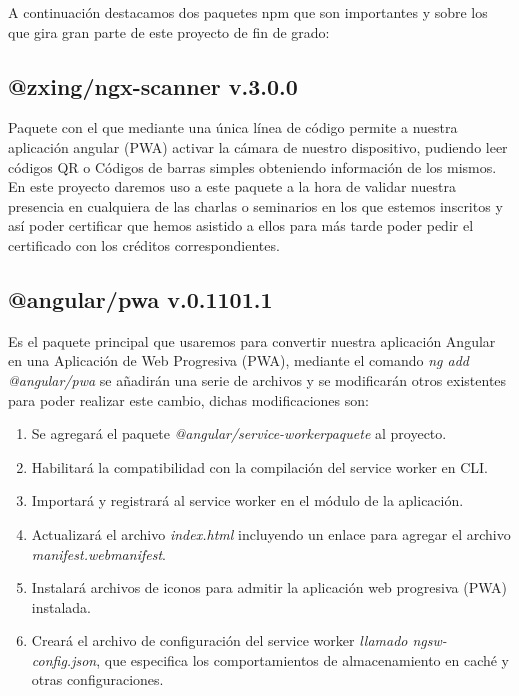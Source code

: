 \documentclass[a4paper, 12pt]{book}
\begin{document}
A continuación destacamos dos paquetes npm que son importantes y sobre los que gira gran parte de este proyecto de fin de grado:

\subsection{@zxing/ngx-scanner v.3.0.0}
\label{subsec:@zxing/ngx-scanner}
Paquete con el que mediante una única línea de código permite a nuestra aplicación angular (PWA) activar la cámara de nuestro dispositivo, pudiendo leer códigos QR o Códigos de barras simples obteniendo información de los mismos. 
	En este proyecto daremos uso a este paquete a la hora de validar nuestra presencia en cualquiera de las charlas o seminarios en los que estemos inscritos y así poder certificar que hemos asistido a ellos para más tarde poder pedir el certificado con los créditos correspondientes.

\subsection{@angular/pwa v.0.1101.1}
\label{subsec:@angular/pwa}
Es el paquete principal que usaremos para convertir nuestra aplicación Angular en una Aplicación de Web Progresiva (PWA), mediante el comando \textit{ng add @angular/pwa} se añadirán una serie de archivos y se modificarán otros existentes para poder realizar este cambio, dichas modificaciones son:

\begin{enumerate}
\item Se agregará el paquete \textit{@angular/service-workerpaquete} al proyecto.

\item Habilitará la compatibilidad con la compilación del service worker en CLI.

\item Importará y registrará al service worker en el módulo de la aplicación.

\item Actualizará el archivo \textit{index.html} incluyendo un enlace para agregar el archivo \textit{manifest.webmanifest}.

\item Instalará archivos de iconos para admitir la aplicación web progresiva (PWA) instalada.

\item Creará el archivo de configuración del service worker \textit{llamado ngsw-config.json}, que especifica los comportamientos de almacenamiento en caché y otras configuraciones.
\end{enumerate}
\end{document}

